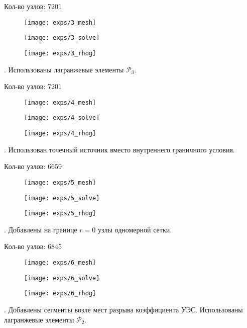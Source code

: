 Кол-во узлов: 7201

\begin{figure}[H]
  \texttt{[image: exps/3\_mesh]}
\end{figure}
\begin{figure}[H]
  \texttt{[image: exps/3\_solve]}
\end{figure}
\begin{figure}[H]
  \texttt{[image: exps/3\_rhog]}
\end{figure}

 \theexp.
Использованы лагранжевые элементы $\mathcal{P}_3$.

Кол-во узлов: 7201

\begin{figure}[H]
  \texttt{[image: exps/4\_mesh]}
\end{figure}
\begin{figure}[H]
  \texttt{[image: exps/4\_solve]}
\end{figure}
\begin{figure}[H]
  \texttt{[image: exps/4\_rhog]}
\end{figure}

 \theexp \label{optimal}.
Использован точечный источник вместо внутреннего граничного условия.

Кол-во узлов: 6659

\begin{figure}[H]
  \texttt{[image: exps/5\_mesh]}
\end{figure}
\begin{figure}[H]
  \texttt{[image: exps/5\_solve]}
\end{figure}
\begin{figure}[H]
  \texttt{[image: exps/5\_rhog]}
\end{figure}

 \theexp.
Добавлены на границе $r = 0$ узлы одномерной сетки.

Кол-во узлов: 6845

\begin{figure}[H]
  \texttt{[image: exps/6\_mesh]}
\end{figure}
\begin{figure}[H]
  \texttt{[image: exps/6\_solve]}
\end{figure}
\begin{figure}[H]
  \texttt{[image: exps/6\_rhog]}
\end{figure}

 \theexp.
Добавлены сегменты возле мест разрыва коэффициента УЭС. Использованы лагранжевые элементы $\mathcal{P}_2$.

